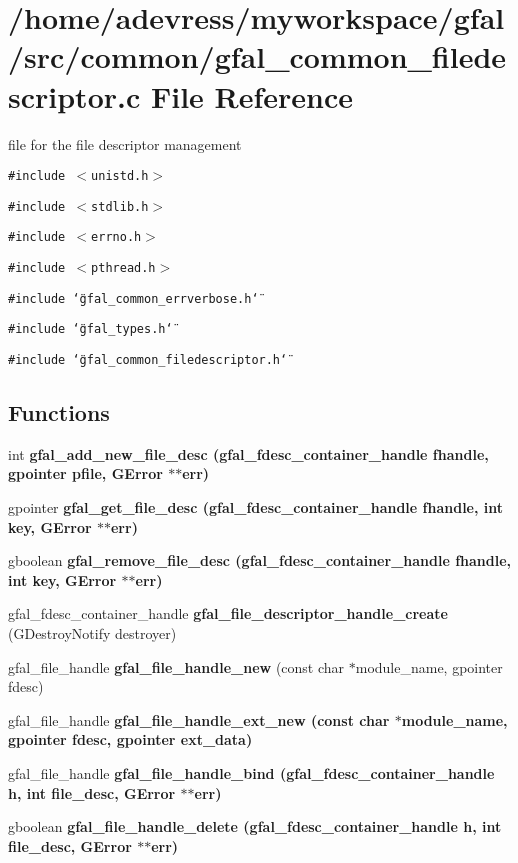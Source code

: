 \section{/home/adevress/myworkspace/gfal/src/common/gfal\_\-common\_\-filedescriptor.c File Reference}
\label{gfal__common__filedescriptor_8c}
file for the file descriptor management 

{\tt \#include $<$unistd.h$>$}\par
{\tt \#include $<$stdlib.h$>$}\par
{\tt \#include $<$errno.h$>$}\par
{\tt \#include $<$pthread.h$>$}\par
{\tt \#include \char`\"{}gfal\_\-common\_\-errverbose.h\char`\"{}}\par
{\tt \#include \char`\"{}gfal\_\-types.h\char`\"{}}\par
{\tt \#include \char`\"{}gfal\_\-common\_\-filedescriptor.h\char`\"{}}\par
\subsection*{Functions}
\begin{CompactItemize}
\item 
int \bf{gfal\_\-add\_\-new\_\-file\_\-desc} (gfal\_\-fdesc\_\-container\_\-handle fhandle, gpointer pfile, GError $\ast$$\ast$err)
\item 
gpointer \bf{gfal\_\-get\_\-file\_\-desc} (gfal\_\-fdesc\_\-container\_\-handle fhandle, int key, GError $\ast$$\ast$err)
\item 
gboolean \bf{gfal\_\-remove\_\-file\_\-desc} (gfal\_\-fdesc\_\-container\_\-handle fhandle, int key, GError $\ast$$\ast$err)
\item 
gfal\_\-fdesc\_\-container\_\-handle \textbf{gfal\_\-file\_\-descriptor\_\-handle\_\-create} (GDestroy\-Notify destroyer)\label{gfal__common__filedescriptor_8c_13934d51ad328aabb0721ef7793ad233}

\item 
gfal\_\-file\_\-handle \textbf{gfal\_\-file\_\-handle\_\-new} (const char $\ast$module\_\-name, gpointer fdesc)\label{gfal__common__filedescriptor_8c_5891a96d47726421216140dba73f5e27}

\item 
gfal\_\-file\_\-handle \bf{gfal\_\-file\_\-handle\_\-ext\_\-new} (const char $\ast$module\_\-name, gpointer fdesc, gpointer ext\_\-data)
\item 
gfal\_\-file\_\-handle \bf{gfal\_\-file\_\-handle\_\-bind} (gfal\_\-fdesc\_\-container\_\-handle h, int file\_\-desc, GError $\ast$$\ast$err)
\item 
gboolean \bf{gfal\_\-file\_\-handle\_\-delete} (gfal\_\-fdesc\_\-container\_\-handle h, int file\_\-desc, GError $\ast$$\ast$err)
\end{CompactItemize}


